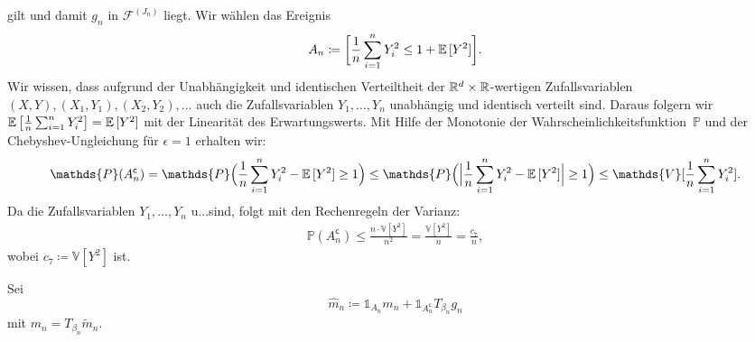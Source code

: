 gilt und damit $g_n$ in $\mathcal{F}^{(J_n)}$ liegt. 
Wir wählen das Ereignis 
\begin{equation}
\label{event}
A_n \coloneqq \bigg[\frac{1}{n} \sum_{i = 1}^n Y_i^2 \leq 1 + \mathbb{E}\,[Y^2]\bigg].
\end{equation}
Wir wissen, dass aufgrund der Unabhängigkeit und identischen Verteiltheit der $\mathbb{R}^d \times \mathbb{R}$-wertigen Zufallsvariablen  $(X, Y), (X_1, Y_1), (X_2, Y_2), \dots$ auch die Zufallsvariablen $Y_1,\dots,Y_n$ unabhängig und identisch verteilt sind. 
Daraus folgern wir $\mathbb{E}\,\big[\frac{1}{n} \sum_{i = 1}^n Y_i^2\big] = \mathbb{E}\,[Y^2]$ mit der Linearität des Erwartungswerts.
Mit Hilfe der Monotonie der Wahrscheinlichkeitsfunktion~$\mathds{P}$ und der Chebyshev-Ungleichung für $\epsilon = 1$ \cite[Satz 5.11]{Klenke2013} erhalten wir:
\begin{equation*}
\begin{split}
\mathds{P}(A_n^{\mathsf{c}}) = \mathds{P}\Big(\frac{1}{n}\sum_{i=1}^n Y_i^2 - \E[Y^2] \geq 1\Big)
\leq \mathds{P}\Big(\Big|\frac{1}{n}\sum_{i=1}^n Y_i^2 - \E[Y^2]\Big| \geq 1\Big)
\leq \mathds{V}[\frac{1}{n}\sum_{i = 1}^nY_i^2].
\end{split}
\end{equation*}
Da die Zufallsvariablen $Y_1,\dots,Y_n$ u.\@i.\@v.\@ sind, folgt mit den Rechenregeln der Varianz:
\begin{equation}
\label{tscheby}
\begin{split}
\mathds{P}(A_n^{\mathsf{c}}) \leq \frac{n \cdot  \mathds{V}[Y^2]}{n^2}
= \frac{\mathds{V}[Y^2]}{n}
= \frac{c_7}{n},
\end{split}
\end{equation}
wobei $c_7 \coloneqq \mathds{V}[Y^2]$ ist.

Sei $$\hat{m}_n \coloneqq \mathds{1}_{A_n}m_n + \mathds{1}_{A_n^{\mathsf{c}}}T_{\beta_n}g_n$$
mit $m_n= T_{\beta_n}\tilde{m}_n$.

